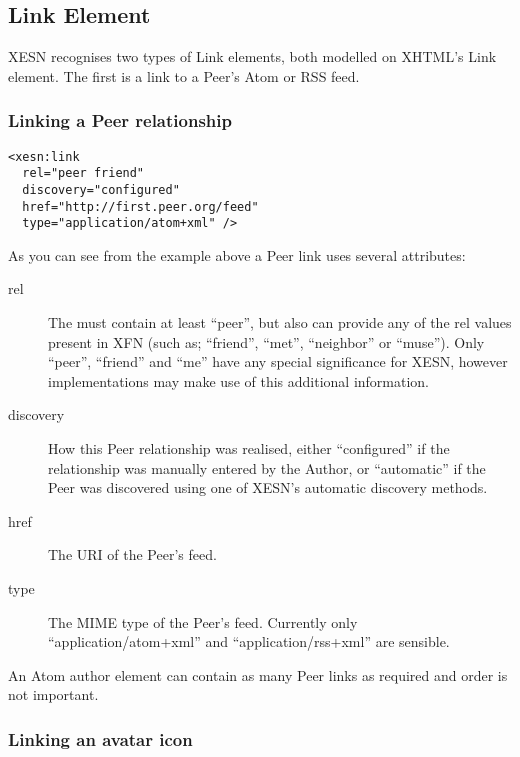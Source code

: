 \documentclass[titlepage,english,a4paper,twoside,dvips]{article}
\begin{document}
\subsection{Link Element}

XESN recognises two types of Link elements, both modelled on XHTML's Link element.  The first is a link to a Peer's Atom or RSS feed.

\subsubsection{Linking a Peer relationship}

\begin{verbatim}
<xesn:link 
  rel="peer friend" 
  discovery="configured" 
  href="http://first.peer.org/feed" 
  type="application/atom+xml" />
\end{verbatim}

As you can see from the example above a Peer link uses several attributes:

\begin{description}

\item[rel] The must contain at least ``peer'', but also can provide any of the rel values present in XFN (such as; ``friend'', ``met'', ``neighbor'' or ``muse'').  Only ``peer'', ``friend'' and ``me'' have any special significance for XESN, however implementations may make use of this additional information.

\item[discovery] How this Peer relationship was realised, either ``configured'' if the relationship was manually entered by the Author, or ``automatic'' if the Peer was discovered using one of XESN's automatic discovery methods. 

\item[href] The URI of the Peer's feed.

\item[type] The MIME type of the Peer's feed.  Currently only ``application/atom+xml'' and ``application/rss+xml'' are sensible.

\end{description}

An Atom author element can contain as many Peer links as required and order is not important.

\subsubsection{Linking an avatar icon}
\end{document}
